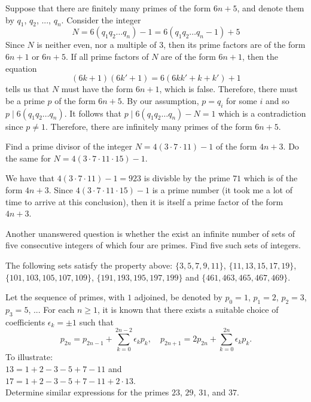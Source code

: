 \begin{solution}
    Suppose that there are finitely many primes of the form $6n+5$, and denote them by $q_1$, $q_2$, ..., $q_n$. Consider the integer
    $$N = 6(q_1q_2\dots q_n) - 1 = 6(q_1q_2\dots q_n - 1) + 5$$
    Since $N$ is neither even, nor a multiple of $3$, then its prime factors are of the form $6n+1$ or $6n+5$. If all prime factors of $N$ are of the form $6n+1$, then the equation
    $$(6k+1)(6k'+1) = 6(6kk' + k + k') + 1$$
    tells us that $N$ must have the form $6n+1$, which is false. Therefore, there must be a prime $p$ of the form $6n+5$. By our assumption, $p = q_i$ for some $i$ and so $p\mid 6(q_1 q_2 \dots q_n)$. It follows that $p \mid 6(q_1 q_2 \dots q_n) - N = 1$ which is a contradiction since $p \neq 1$. Therefore, there are infinitely many primes of the form $6n+5$. \\
\end{solution}

\begin{exercise}
    Find a prime divisor of the integer $N = 4(3\cdot 7 \cdot 11) - 1$ of the form $4n+3$. Do the same for $N = 4(3\cdot 7 \cdot 11 \cdot 15) - 1$.\\
\end{exercise}

\begin{solution}
    We have that $4(3\cdot 7 \cdot 11) - 1 = 923$ is divisble by the prime $71$ which is of the form $4n+3$. Since $4(3\cdot 7 \cdot 11 \cdot 15) - 1$ is a prime number (it took me a lot of time to arrive at this conclusion), then it is itself a prime factor of the form $4n+3$. \\
\end{solution}

\begin{exercise}
    Another unanswered question is whether the exist an infinite number of sets of five consecutive integers of which four are primes. Find five such sets of integers. \\
\end{exercise}

\begin{solution}
    The following sets satisfy the property above: $\{3,5,7,9,11\}$, $\{11,13,15,17,19\}$, $\{101,103,105,107,109\}$, $\{191,193,195,197,199\}$ and $\{461,463,465,467,469\}$. \\
\end{solution}

\begin{exercise}
    Let the sequence of primes, with $1$ adjoined, be denoted by $p_0 = 1$, $p_1 = 2$, $p_2 = 3$, $p_3 = 5$, ... For each $n \geq 1$, it is known that there exists a suitable choice of coefficients $\epsilon_k = \pm 1$ such that
    $$p_{2n} = p_{2n-1} + \sum_{k=0}^{2n-2}\epsilon_kp_k, \quad p_{2n+1} = 2p_{2n} + \sum_{k=0}^{2n}\epsilon_k p_k .$$
    To illustrate:\\
    $13 = 1+2 - 3 - 5 + 7 - 11$ and \\
    $17 = 1 + 2 - 3 - 5 + 7  - 11 + 2\cdot 13$.\\
    Determine similar expressions for the primes $23$, $29$, $31$, and $37$.\\
\end{exercise}

